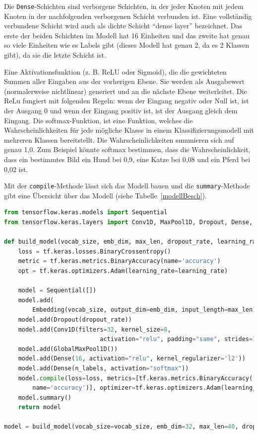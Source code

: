 Die \texttt{Dense}-Schichten sind verborgene Schichten, in der jeder Knoten mit jedem Knoten in der nachfolgenden verborgenen Schicht verbunden ist. Eine vollständig verbundene Schicht wird auch als dichte Schicht \enquote{dense layer} bezeichnet. Das erste der beiden Schichten im Modell hat 16 Einheiten und das zweite hat genau so viele Einheiten wie es Labels gibt (dieses Modell hat genau 2, da es 2 Klassen gibt), da sie die letzte Schicht ist.

Eine Aktivationsfunktion (z. B. ReLU oder Sigmoid), die die gewichteten Summen aller Eingaben aus der vorherigen Ebene. Sie werden als Ausgabewert (normalerweise nichtlinear) generiert und an die nächste Ebene weiterleitet. Die ReLu fungiert mit folgenden Regeln: wenn der Eingang negativ oder Null ist, ist der Ausgang 0 und wenn der Eingang positiv ist, ist der Ausgang gleich dem Eingang. Die softmax-Funktion, ist eine Funktion, welches die Wahrscheinlichkeiten für jede mögliche Klasse in einem Klassifizierungsmodell mit mehreren Klassen bereitstellt. Die Wahrscheinlichkeiten summieren sich auf genau 1,0. Zum Beispiel könnte softmax bestimmen, dass die Wahrscheinlichkeit, dass ein bestimmtes Bild ein Hund bei 0,9, eine Katze bei 0,08 und ein Pferd bei 0,02 ist.

Mit der \texttt{compile}-Methode lässt sich das Modell bauen und die \texttt{summary}-Methode gibt eine Übersicht über das Modell (siehe Tabelle~\ref{modellBesch}).




\begin{lstlisting}[language=Python,caption=Das Bilden des Models]
from tensorflow.keras.models import Sequential
from tensorflow.keras.layers import Conv1D, MaxPool1D, Dropout, Dense, GlobalMaxPool1D, Embedding, Activation

def build_model(vocab_size, emb_dim, max_len, dropout_rate, learning_rate, n_labels):
    loss = tf.keras.losses.BinaryCrossentropy()
    metric = tf.keras.metrics.BinaryAccuracy(name='accuracy')
    opt = tf.keras.optimizers.Adam(learning_rate=learning_rate)

    model = Sequential([])
    model.add(
        Embedding(vocab_size, output_dim=emb_dim, input_length=max_len))
    model.add(Dropout(dropout_rate))
    model.add(Conv1D(filters=32, kernel_size=8,
                           activation="relu", padding="same", strides=1))
    model.add(GlobalMaxPool1D())
    model.add(Dense(16, activation="relu", kernel_regularizer='l2'))
    model.add(Dense(n_labels, activation="softmax"))
    model.compile(loss=loss, metrics=[tf.keras.metrics.BinaryAccuracy(
        name='accuracy')], optimizer=tf.keras.optimizers.Adam(learning_rate=learning_rate))
    model.summary()
    return model
    
model = build_model(vocab_size=vocab_size, emb_dim=32, max_len=40, dropout_rate=0.3, learning_rate=0.00006, n_labels=len(labels))
\end{lstlisting}\label{BuildModel}




